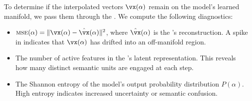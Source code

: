  To determine if the interpolated vectors $\vx(\alpha)$ remain on the model's learned manifold, we pass them through the \sae. We compute the following diagnostics:
\begin{itemize}[leftmargin=*,itemsep=0pt,topsep=0pt]
    \item {} $\mse(\alpha) = \| \vx(\alpha) - \hat{\vx}(\alpha) \|^2$, where $\hat{\vx}(\alpha)$ is the \sae's reconstruction. A spike in \mse indicates that $\vx(\alpha)$ has drifted into an off-manifold region.
    \item {} The number of active features in the \sae's latent representation. This reveals how many distinct semantic units are engaged at each step.
    \item {} The Shannon entropy of the model's output probability distribution $P(\alpha)$. High entropy indicates increased uncertainty or semantic confusion.
\end{itemize}

